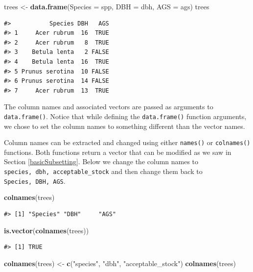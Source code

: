 \documentclass[
  11pt,
]{krantz}
\newenvironment{Shaded}{\begin{snugshade}}{\end{snugshade}}
\newcommand{\DataTypeTok}[1]{\textcolor[rgb]{0.13,0.29,0.53}{#1}}
\newcommand{\KeywordTok}[1]{\textcolor[rgb]{0.13,0.29,0.53}{\textbf{#1}}}
\newcommand{\NormalTok}[1]{#1}
\newcommand{\StringTok}[1]{\textcolor[rgb]{0.31,0.60,0.02}{#1}}
\theoremstyle{definition}
\theoremstyle{definition}
\theoremstyle{definition}
\theoremstyle{definition}
\theoremstyle{remark}
\begin{document}
\begin{Shaded}
\begin{Highlighting}[]
\NormalTok{trees \textless{}{-}}\StringTok{ }\KeywordTok{data.frame}\NormalTok{(}\DataTypeTok{Species =}\NormalTok{ spp, }\DataTypeTok{DBH =}\NormalTok{ dbh, }\DataTypeTok{AGS =}\NormalTok{ ags)}
\NormalTok{trees}
\end{Highlighting}
\end{Shaded}

\begin{verbatim}
#>           Species DBH   AGS
#> 1     Acer rubrum  16  TRUE
#> 2     Acer rubrum   8  TRUE
#> 3    Betula lenta   2 FALSE
#> 4    Betula lenta  16  TRUE
#> 5 Prunus serotina  10 FALSE
#> 6 Prunus serotina  14 FALSE
#> 7     Acer rubrum  13  TRUE
\end{verbatim}

The column names and associated vectors are passed as arguments to \texttt{data.frame()}. Notice that while defining the \texttt{data.frame()} function arguments, we chose to set the column names to something different than the vector names.

Column names can be extracted and changed using either \texttt{names()} or \texttt{colnames()} functions. Both functions return a vector that can be modified as we saw in Section \ref{basicSubsetting}. Below we change the column names to \texttt{species,\ dbh,\ acceptable\_stock} and then change them back to \texttt{Species,\ DBH,\ AGS}.

\begin{Shaded}
\begin{Highlighting}[]
\KeywordTok{colnames}\NormalTok{(trees)}
\end{Highlighting}
\end{Shaded}

\begin{verbatim}
#> [1] "Species" "DBH"     "AGS"
\end{verbatim}

\begin{Shaded}
\begin{Highlighting}[]
\KeywordTok{is.vector}\NormalTok{(}\KeywordTok{colnames}\NormalTok{(trees))}
\end{Highlighting}
\end{Shaded}

\begin{verbatim}
#> [1] TRUE
\end{verbatim}

\begin{Shaded}
\begin{Highlighting}[]
\KeywordTok{colnames}\NormalTok{(trees) \textless{}{-}}\StringTok{ }\KeywordTok{c}\NormalTok{(}\StringTok{"species"}\NormalTok{, }\StringTok{"dbh"}\NormalTok{, }\StringTok{"acceptable\_stock"}\NormalTok{)}
\KeywordTok{colnames}\NormalTok{(trees)}
\end{Highlighting}
\end{Shaded}
\end{document}
